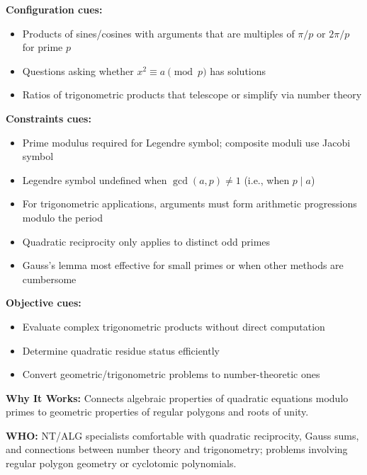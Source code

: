 \documentclass[12pt]{article}
\begin{document}
\textbf{Configuration cues:}
\begin{itemize}
    \item Products of sines/cosines with arguments that are multiples of $\pi/p$ or $2\pi/p$ for prime $p$
    \item Questions asking whether $x^2 \equiv a \pmod{p}$ has solutions
    \item Ratios of trigonometric products that telescope or simplify via number theory
\end{itemize}

\textbf{Constraints cues:}
\begin{itemize}
    \item Prime modulus required for Legendre symbol; composite moduli use Jacobi symbol
    \item Legendre symbol undefined when $\gcd(a,p) \neq 1$ (i.e., when $p \mid a$)
    \item For trigonometric applications, arguments must form arithmetic progressions modulo the period
    \item Quadratic reciprocity only applies to distinct odd primes
    \item Gauss's lemma most effective for small primes or when other methods are cumbersome
\end{itemize}

\textbf{Objective cues:}
\begin{itemize}
    \item Evaluate complex trigonometric products without direct computation
    \item Determine quadratic residue status efficiently
    \item Convert geometric/trigonometric problems to number-theoretic ones
\end{itemize}

\textbf{Why It Works:} Connects algebraic properties of quadratic equations modulo primes to geometric properties of regular polygons and roots of unity.

\textbf{WHO:} NT/ALG specialists comfortable with quadratic reciprocity, Gauss sums, and connections between number theory and trigonometry; problems involving regular polygon geometry or cyclotomic polynomials.
\end{document}
